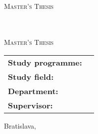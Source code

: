 \newcommand{\coverTop}{
    \begin{center}
        {\textbf \Large \textsc {\settingsSchool \\ \settingsFaculty}}
        \vfill
        {\LARGE \em \settingsTitle}
        \\
        \medskip
        {\large \textsc{Master's Thesis}}
    \end{center}
}

\newcommand{\coverCenter}{
    \begin{tabular}{l l}
        \textbf{Study programme:} & \settingsProgramme \\
        \textbf{Study field:} & \settingsField \\
        \textbf{Department:} & \settingsDepartment \\
        \textbf{Supervisor:} &  \settingsAdvisor
    \end{tabular}
}

\newcommand{\coverBottom}{
    \begin{center}
        {\settingsYear \hfill \settingsAuthor}
    \end{center}
}

\thispagestyle{empty}
\coverTop
\vfill
\begin{center}
    {\settingsYear \hfill \settingsAuthor}
\end{center}
\newpage

\thispagestyle{empty}
\coverTop
\vfill
\coverCenter
\vfill
\begin{center}
    {Bratislava, \settingsYear \hfill \settingsAuthor}
\end{center}
\newpage

